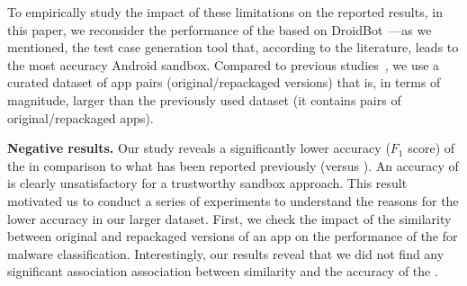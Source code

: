 

To empirically study the impact of these limitations on the reported results, in this paper, we reconsider the performance of the \mas based on
DroidBot~\cite{DBLP:conf/icse/LiYGC17}---as we mentioned, the test case generation tool that, according to the literature, leads to the most accuracy Android sandbox. 
Compared to previous studies~\cite{DBLP:conf/wcre/BaoLL18,DBLP:conf/scam/CostaMCMVBC20},
we use a curated dataset of app pairs (original/repackaged versions) that is, in terms of magnitude, larger than the previously used
dataset (it contains \apps pairs of original/repackaged apps).
 
{\bf Negative results.} Our study reveals a significantly lower
accuracy ($F_1$ score) of the \mas in comparison to what has been reported previously (\fscore versus \fscoreSmall). 
An accuracy of \fscore is clearly unsatisfactory for a trustworthy sandbox approach.
This result motivated us to conduct a series of experiments 
to understand the reasons for the lower accuracy in our larger dataset.
First, we check the impact of the similarity between original and repackaged versions of
an app on the performance of the \mas for malware classification. Interestingly, our results reveal that we did not find any significant association association between similarity and the accuracy of the \mas . 

